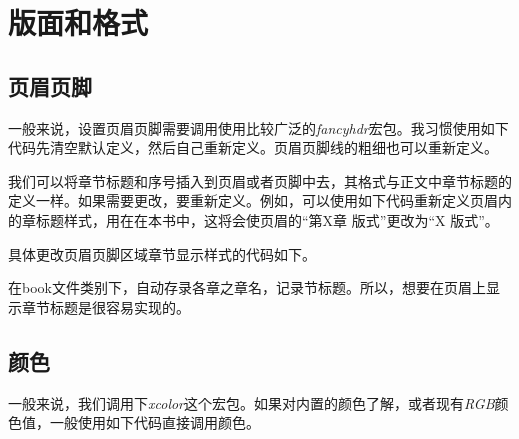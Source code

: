 \newpage

{\let\clearpage\relax \chapter{版面和格式}}

\section{页眉页脚}
一般来说，设置页眉页脚需要调用使用比较广泛的\emph{fancyhdr}宏包。我习惯使用如下代码先清空默认定义，然后自己重新定义。页眉页脚线的粗细也可以重新定义。

\begin{latex}
\usepackage{fancyhdr}
\pagestyle{fancy}
\fancyhf{}					%
	\lhead{}				%
	\cfoot{}
	\fancyhead[RO,LE]{}		%
	\fancyfoot[LE,RO]{\thepage}
\renewcommand{\headrulewidth}{0.4 pt}
\renewcommand{\footrulewidth}{0.4 pt}
\end{latex}


我们可以将章节标题和序号插入到页眉或者页脚中去，其格式与正文中章节标题的定义一样。如果需要更改，要重新定义。例如，可以使用如下代码重新定义页眉内的章标题样式，用在在本书中，这将会使页眉的“第X章 版式”更改为“X 版式”。 

具体更改页眉页脚区域章节显示样式的代码如下。

\begin{latex}
	\renewcommand{\chaptermark}[1]{\markleft{\thesection.\#1}}
\renewcommand{\chaptermark}[1]{\markboth{\thechapter.\ #1}{节样式空置表示修改章样式}}
\renewcommand{\chaptermark}[1]{\markboth{章样式}{节样式}}
\end{latex}


在book文件类别下，\emph{\leftmark}自动存录各章之章名，\emph{\rightmark}记录节标题。所以，想要在页眉上显示章节标题是很容易实现的。


\begin{latex}
\lhead{\leftmark}			%
\rhead{\rightmark}			%
\end{latex}


\section{颜色}
一般来说，我们调用下\emph{xcolor}这个宏包。如果对内置的颜色了解，或者现有\emph{RGB}颜色值，一般使用如下代码直接调用颜色。

\begin{center}
	\color[RGB]{204, 128, 92}{Color Text中文测试}
\end{center}

